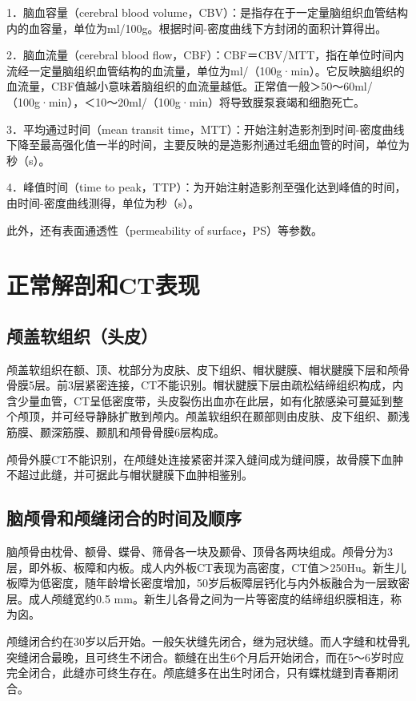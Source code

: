 1．脑血容量（cerebral blood
volume，CBV）：是指存在于一定量脑组织血管结构内的血容量，单位为ml/100g。根据时间-密度曲线下方封闭的面积计算得出。

2．脑血流量（cerebral blood
flow，CBF）：CBF＝CBV/MTT，指在单位时间内流经一定量脑组织血管结构的血流量，单位为ml/（100g·min）。它反映脑组织的血流量，CBF值越小意味着脑组织的血流量越低。正常值一般＞50～60ml/（100g·min），＜10～20ml/（100g·min）将导致膜泵衰竭和细胞死亡。

3．平均通过时间（mean transit
time，MTT）：开始注射造影剂到时间-密度曲线下降至最高强化值一半的时间，主要反映的是造影剂通过毛细血管的时间，单位为秒（s）。

4．峰值时间（time to
peak，TTP）：为开始注射造影剂至强化达到峰值的时间，由时间-密度曲线测得，单位为秒（s）。

此外，还有表面通透性（permeability of surface，PS）等参数。

\section{正常解剖和CT表现}

\subsection{颅盖软组织（头皮）}

颅盖软组织在额、顶、枕部分为皮肤、皮下组织、帽状腱膜、帽状腱膜下层和颅骨骨膜5层。前3层紧密连接，CT不能识别。帽状腱膜下层由疏松结缔组织构成，内含少量血管，CT呈低密度带，头皮裂伤出血亦在此层，如有化脓感染可蔓延到整个颅顶，并可经导静脉扩散到颅内。颅盖软组织在颞部则由皮肤、皮下组织、颞浅筋膜、颞深筋膜、颞肌和颅骨骨膜6层构成。

颅骨外膜CT不能识别，在颅缝处连接紧密并深入缝间成为缝间膜，故骨膜下血肿不超过此缝，并可据此与帽状腱膜下血肿相鉴别。

\subsection{脑颅骨和颅缝闭合的时间及顺序}

脑颅骨由枕骨、额骨、蝶骨、筛骨各一块及颞骨、顶骨各两块组成。颅骨分为3层，即外板、板障和内板。成人内外板CT表现为高密度，CT值＞250Hu。新生儿板障为低密度，随年龄增长密度增加，50岁后板障层钙化与内外板融合为一层致密层。成人颅缝宽约0.5
mm。新生儿各骨之间为一片等密度的结缔组织膜相连，称为囟。

颅缝闭合约在30岁以后开始。一般矢状缝先闭合，继为冠状缝。而人字缝和枕骨乳突缝闭合最晚，且可终生不闭合。额缝在出生6个月后开始闭合，而在5～6岁时应完全闭合，此缝亦可终生存在。颅底缝多在出生时闭合，只有蝶枕缝到青春期闭合。

